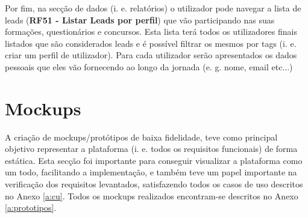Por fim, na secção de dados (i. e. relatórios) o utilizador pode navegar a lista de leads (\textbf{RF51 - Listar Leads por perfil}) que vão participando nas suas formações, questionários e concursos. Esta lista terá todos os utilizadores finais listados que são considerados leads e é possível filtrar os mesmos por tags (i. e. criar um perfil de utilizador). Para cada utilizador serão apresentados os dados pessoais que eles vão fornecendo ao longo da jornada (e. g. nome, email etc...)




\section{Mockups}
\label{prototipagem}

A criação de mockups/protótipos de baixa fidelidade, teve como principal objetivo representar a plataforma (i. e. todos os requisitos funcionais) de forma estática. Esta secção foi importante para conseguir visualizar a plataforma como um todo, facilitando a implementação, e também teve um papel importante na verificação dos requisitos levantados, satisfazendo todos os casos de uso descritos no Anexo \ref{a:cu}. Todos os mockups realizados encontram-se descritos no Anexo \ref{a:prototipos}.


\blankpage

\glsresetall